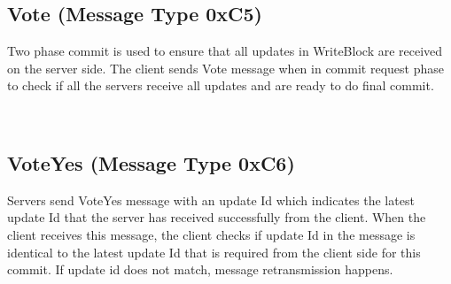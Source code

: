 \documentclass[12pt,fleqn]{article}
\begin{document}
\begin{center}
	\begin{bytefield}[bitwidth=1.1em]{16}
		 \\
		 \\
		 \\
		 \\
		 \\
	\end{bytefield}
\end{center}

\subsection{Vote (Message Type 0xC5)}
Two phase commit is used to ensure that all updates in WriteBlock are received on the server side. 
The client sends Vote message when in commit request phase to check if all the servers receive all updates and are ready to do final commit.
 
\begin{center}
	\begin{bytefield}[bitwidth=1.1em]{16}
		 \\
	\end{bytefield}
\end{center}

\subsection{VoteYes (Message Type 0xC6)}
Servers send VoteYes message with an update Id which indicates the latest update Id that the server has received successfully from the client. When the client receives this message, the client checks if update Id in the message is identical to the latest update Id that is required from the client side for this commit. If update id does not match, message retransmission happens. 

\begin{center}
	\begin{bytefield}[bitwidth=1.1em]{16}
		 \\
		 \\
	\end{bytefield}
\end{center}
\end{document}
